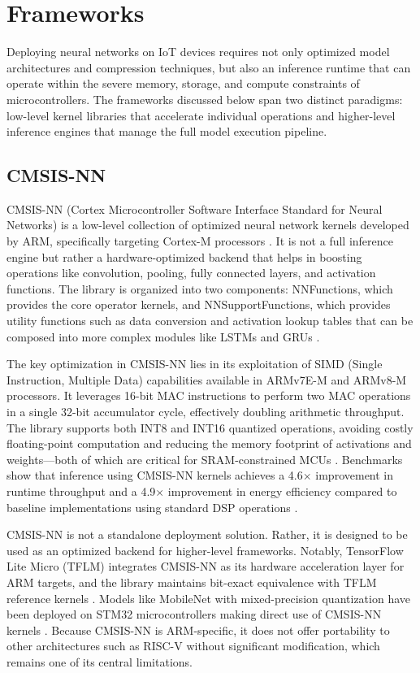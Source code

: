 \documentclass[conference]{IEEEtran}
\begin{document}
	\section{Frameworks}
	
	Deploying neural networks on IoT devices requires not only optimized model architectures and compression techniques, but also an inference runtime that can operate within the severe memory, storage, and compute constraints of microcontrollers. The frameworks discussed below span two distinct paradigms: low-level kernel libraries that accelerate individual operations and higher-level inference engines that manage the full model execution pipeline.
	
	\subsection{CMSIS-NN}
	
	CMSIS-NN (Cortex Microcontroller Software Interface Standard for Neural Networks) is a low-level collection of optimized neural network kernels developed by ARM, specifically targeting Cortex-M processors \cite{cmsisnn2018}. It is not a full inference engine but rather a hardware-optimized backend that helps in boosting operations like convolution, pooling, fully connected layers, and activation functions. The library is organized into two components: NNFunctions, which provides the core operator kernels, and NNSupportFunctions, which provides utility functions such as data conversion and activation lookup tables that can be composed into more complex modules like LSTMs and GRUs \cite{cmsisnn2018}.
	
	The key optimization in CMSIS-NN lies in its exploitation of SIMD (Single Instruction, Multiple Data) capabilities available in ARMv7E-M and ARMv8-M processors. It leverages 16-bit MAC instructions to perform two MAC operations in a single 32-bit accumulator cycle, effectively doubling arithmetic throughput. The library supports both INT8 and INT16 quantized operations, avoiding costly floating-point computation and reducing the memory footprint of activations and weights—both of which are critical for SRAM-constrained MCUs \cite{cmsisnn2018}. Benchmarks show that inference using CMSIS-NN kernels achieves a 4.6$\times$ improvement in runtime throughput and a 4.9$\times$ improvement in energy efficiency compared to baseline implementations using standard DSP operations \cite{cmsisnn2018}.
	
	CMSIS-NN is not a standalone deployment solution. Rather, it is designed to be used as an optimized backend for higher-level frameworks. Notably, TensorFlow Lite Micro (TFLM) integrates CMSIS-NN as its hardware acceleration layer for ARM targets, and the library maintains bit-exact equivalence with TFLM reference kernels \cite{cmsisnn_github}. Models like MobileNet with mixed-precision quantization have been deployed on STM32 microcontrollers making direct use of CMSIS-NN kernels \cite{rusci2019}. Because CMSIS-NN is ARM-specific, it does not offer portability to other architectures such as RISC-V without significant modification, which remains one of its central limitations.
	
\end{document}
